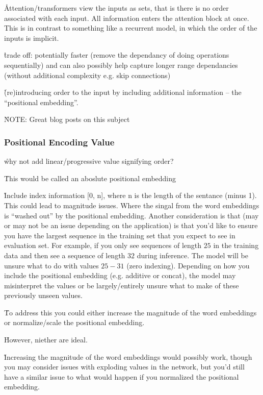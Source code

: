 \r{Attention/transformers view the inputs as sets, that is there is no order associated with each input. All information enters the attention block at once. This is in contrast to something like a recurrent model, in which the order of the inputs is implicit.}

\r{trade off: potentially faster (remove the dependancy of doing operations sequentially) and can also possibly help capture longer range dependancies (without additional complexity e.g. skip connections)}

\r{(re)introducing order to the input by including additional information -- the ``positional embedding''.}

\r{NOTE: Great blog posts on this subject~\cite{kazemnejad_2021, kernes_2021, kernes_2021B}}

\subsubsection{Positional Encoding Value}

\r{why not add linear/progressive value signifying order?}

\r{This would be called an aboslute positional embedding}

\r{Include index information [0, n], where n is the length of the sentance (minus 1). This could lead to magnitude issues. Where the singal from the word embeddings is ``washed out'' by the positional embedding.  Another consideration is that (may or may not be an issue depending on the application) is that you'd like to ensure you have the largest sequence in the training set that you expect to see in evaluation set. For example, if you only see sequences of length $25$ in the training data and then see a sequence of length $32$ during inference. The model will be unsure what to do with values $25 - 31$ (zero indexing). Depending on how you include the positional embedding (e.g. additive or concat), the model may misinterpret the values or be largely/entirely unsure what to make of these previously unseen values.}
	
	
\r{To address this you could either increase the magnitude of the word embeddings or normalize/scale the positional embedding.}

\r{However, niether are ideal.}

\r{Increasing the magnitude of the word embeddings would possibly work, though you may consider issues with exploding values in the network, but you'd still have a similar issue to what would happen if you normalized the positional embedding. }

